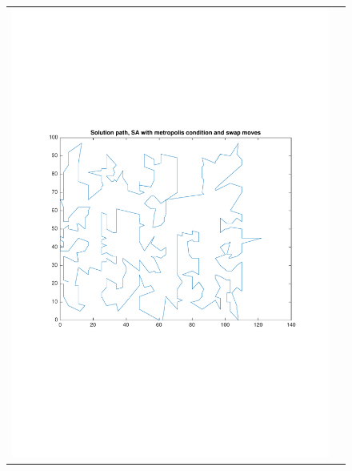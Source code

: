\documentclass[a4paper, 11pt]{scrartcl}
\begin{document}
\begin{figure}[!ht]
  \centering
  \begin{tabular}{cc}
    \includegraphics[scale=0.4, trim={3cm 6cm 1cm 6cm}]{../figures/solutionPath_SA_metropolis_swap.pdf} & 

\end{tabular}
\end{figure}
\end{document}

